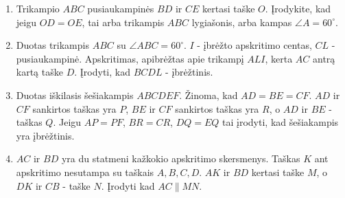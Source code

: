 \begin{enumerate}
\item Trikampio $ABC$ pusiaukampinės $BD$ ir $CE$ kertasi
  taške $O$. Įrodykite, kad jeigu $OD = OE$, tai arba
  trikampis $ABC$ lygiašonis, arba kampas $\angle
  A=60^\circ$.
\item Duotas trikampis $ABC$ su $\angle ABC = 60^\circ$.
  $I$ - įbrėžto apskritimo centas, $CL$ - pusiaukampinė.
  Apskritimas, apibrėžtas apie trikampį $ALI$, kerta $AC$
  antrą kartą taške $D$. Įrodyti, kad $BCDL$ - įbrėžtinis.
\item Duotas iškilasis šešiakampis $ABCDEF$. Žinoma, kad $AD
  = BE = CF$. $AD$ ir $CF$ sankirtos taškas yra $P$, $BE$ ir
  $CF$ sankirtos taškas yra $R$, o $AD$ ir $BE$ - taškas
  $Q$.  Jeigu $AP = PF$, $BR = CR$, $DQ = EQ$ tai įrodyti,
  kad šešiakampis yra įbrėžtinis.
\item $AC$ ir $BD$ yra du statmeni kažkokio apskritimo
  skersmenys. Taškas $K$ ant apskritimo nesutampa su taškais
  $A, B, C, D$. $AK$ ir $BD$ kertasi taške $M$, o $DK$ ir
  $CB$ - taške $N$. Įrodyti kad $AC\parallel{MN}$.

\end{enumerate}
